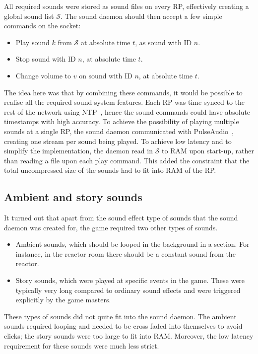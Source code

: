 All required sounds were stored as sound files on every RP,
effectively creating a global sound list $\mathcal{S}$. The sound
daemon should then accept a few simple commands on the socket:
\begin{itemize}
\item Play sound $k$ from $\mathcal{S}$ at absolute time $t$, as sound with ID $n$.
\item Stop sound with ID $n$, at absolute time $t$.
\item Change volume to $v$ on sound with ID $n$, at absolute time $t$.
\end{itemize}

The idea here was that by combining these commands, it would be
possible to realise all the required sound system features. Each RP was time
synced to the rest of the network using NTP~\cite{ntp}, hence the
sound commands could have absolute timestamps with high accuracy. To
achieve the possibility of playing multiple sounds at a single RP, the
sound daemon communicated with PulseAudio~\cite{pulseaudio}, creating
one stream per sound being played. To achieve low latency and to
simplify the implementation, the daemon read in $\mathcal{S}$ to RAM
upon start-up, rather than reading a file upon each play command. This
added the constraint that the total uncompressed size of the sounds
had to fit into RAM of the RP\@.

\subsection{Ambient and story sounds}

It turned out that apart from the sound effect type of sounds that
the sound daemon was created for, the game required two other types of sounds.
\begin{itemize}
\item Ambient sounds, which should be looped in the background in a section. For instance, in the reactor room there should be a constant sound from the reactor.
\item Story sounds, which were played at specific events in the game. These were typically very long compared to ordinary sound effects and were triggered explicitly by the game masters.
\end{itemize}

These types of sounds did not quite fit into the sound daemon. The
ambient sounds required looping and needed to be cross faded into
themselves to avoid clicks; the story sounds were too large to fit
into RAM\@. Moreover, the low latency requirement for these
sounds were much less strict.

